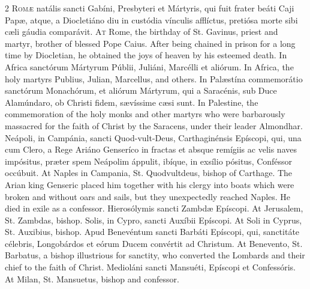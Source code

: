 \begin{paracol}{2}
\lettrine[lines=2]{R}{omæ} natális sancti Gabíni, Presbyteri et 
 Mártyris, qui fuit frater beáti Caji Papæ, atque, a Diocletiáno diu in 
 custódia vínculis afflíctus, pretiósa morte sibi cæli gáudia comparávit.
\switchcolumn
{}
\lettrine[lines=2]{A}{t} Rome, the birthday of St. Gavinus, priest and martyr, brother of blessed 
 Pope Caius. After being chained in prison for a long time by 
 Diocletian, he obtained the joys of heaven by his esteemed death.
\switchcolumn*
{}
In Africa sanctórum Mártyrum Públii, Juliáni, Marcélli et aliórum.
\switchcolumn
{}
In Africa, the holy martyrs Publius, Julian, Marcellus, and others.
\switchcolumn*
{}
In Palæstína commemorátio sanctórum Monachórum, 
 et aliórum Mártyrum, qui a Saracénis, sub Duce Alamúndaro, ob Christi fidem, 
 sævíssime cæsi sunt.
\switchcolumn
{}
In Palestine, the commemoration of the holy monks and other martyrs who were 
 barbarously massacred for the faith of Christ by the Saracens, under their 
 leader Almondhar.
\switchcolumn*
{}
Neápoli, in Campánia, sancti Quod-vult-Deus, Carthaginénsis Epíscopi, qui, 
 una cum Clero, a Rege Ariáno Genseríco in 
 fractas et absque remígiis ac velis naves impósitus, præter spem Neápolim áppulit, ibíque, in exsílio pósitus, Conféssor occúbuit.
\switchcolumn
{}
At Naples in Campania, St. Quodvultdeus, bishop of Carthage. The Arian 
 king Genseric placed him together with his clergy into boats which were 
 broken and without oars and sails, but they unexpectedly reached Naples. 
 He died in exile as a confessor.
\switchcolumn*
{}
Hierosólymis sancti Zambdæ Epíscopi.
\switchcolumn
{}
At Jerusalem, St. Zambdas, bishop.
\switchcolumn*
{}
Solis, in Cypro, sancti Auxíbii Epíscopi.
\switchcolumn
{}
At Soli in Cyprus, St. Auxibius, bishop.
\switchcolumn*
{}
Apud Benevéntum sancti Barbáti Epíscopi, qui, sanctitáte célebris, 
 Longobárdos et eórum Ducem convértit ad Christum.
\switchcolumn
{}
At Benevento, St. Barbatus, a bishop illustrious for sanctity, who converted 
 the Lombards and their chief to the faith of Christ.
\switchcolumn*
{}
Medioláni sancti Mansuéti, Epíscopi et Confessóris.
\switchcolumn
{}
At Milan, St. Mansuetus, bishop and confessor.
\switchcolumn*
{}
\end{paracol}


